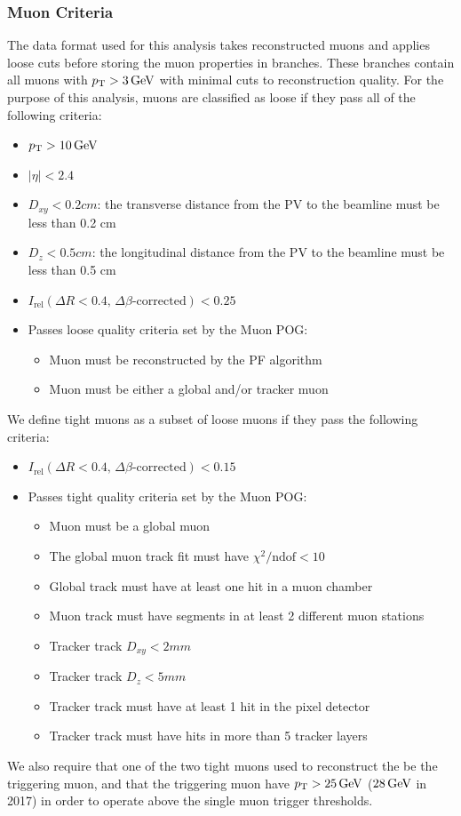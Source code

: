 \subsubsection{Muon Criteria} \label{sec:ana_muons}
The data format used for this analysis takes reconstructed muons and applies loose cuts before storing the muon properties in branches. These branches contain all muons with $p_{\mathrm{T}}>3\,\text{Ge\hspace{-.08em}V}$ with minimal cuts to reconstruction quality. For the purpose of this analysis, muons are classified as loose if they pass all of the following criteria:
\begin{itemize}
	\item $p_{\mathrm{T}}>10\,\text{Ge\hspace{-.08em}V}$
	\item $|\eta|<2.4$
	\item $D_{xy}<0.2\unit{cm}$: the transverse distance from the PV to the beamline must be less than 0.2 cm
	\item $D_{z}<0.5\unit{cm}$: the longitudinal distance from the PV to the beamline must be less than 0.5 cm
	\item $I_\text{rel}(\Delta R<0.4,\,\Delta\beta\text{-corrected})<0.25$
	\item Passes loose quality criteria set by the Muon POG:
	\begin{itemize}
		\item Muon must be reconstructed by the PF algorithm
		\item Muon must be either a global and/or tracker muon
	\end{itemize}
\end{itemize}
We define tight muons as a subset of loose muons if they pass the following criteria:
\begin{itemize}
	\item $I_\text{rel}(\Delta R<0.4,\,\Delta\beta\text{-corrected})<0.15$
	\item Passes tight quality criteria set by the Muon POG:
	\begin{itemize}
		\item Muon must be a global muon
		\item The global muon track fit must have $\chi^2/\text{ndof}<10$
		\item Global track must have at least one hit in a muon chamber %
		\item Muon track must have segments in at least 2 different muon stations %
		\item Tracker track $D_{xy}<2\unit{mm}$
		\item Tracker track $D_{z}<5\unit{mm}$
		\item Tracker track must have at least 1 hit in the pixel detector
		\item Tracker track must have hits in more than 5 tracker layers
	\end{itemize}
\end{itemize}
We also require that one of the two tight muons used to reconstruct the \PZ be the triggering muon, and that the triggering muon have $p_{\mathrm{T}}>25\,\text{Ge\hspace{-.08em}V}$ ($28\,\text{Ge\hspace{-.08em}V}$ in 2017) in order to operate above the single muon trigger \pt thresholds.

